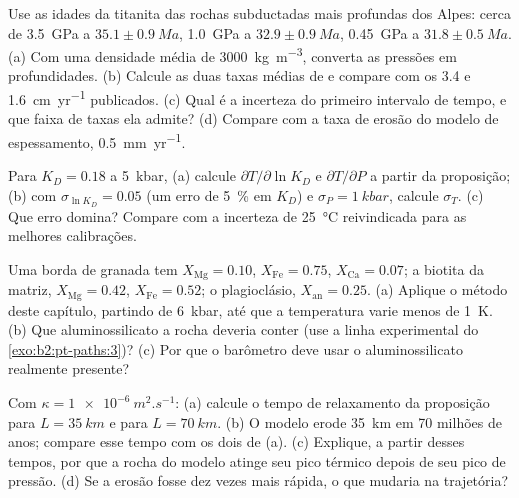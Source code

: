 \begin{exercise}[$\star\star$]\label{exo:b2:pt-paths:8}
Use as idades da titanita das rochas subductadas mais profundas dos Alpes: cerca de \qty{3.5}{GPa} a
$35.1 \pm \qty{0.9}{Ma}$, \qty{1.0}{GPa} a $32.9 \pm \qty{0.9}{Ma}$, \qty{0.45}{GPa} a
$31.8 \pm \qty{0.5}{Ma}$. (a) Com uma densidade média de \qty{3000}{kg.m^{-3}}, converta as
pressões em profundidades. (b) Calcule as duas taxas médias de  e compare com os
3.4 e \qty{1.6}{cm.yr^{-1}} publicados. (c) Qual é a incerteza do primeiro intervalo de
tempo, e que faixa de taxas ela admite? (d) Compare com a taxa de erosão do
modelo de espessamento, \qty{0.5}{mm.yr^{-1}}.
\end{exercise}

\begin{exercise}[$\star\star$]\label{exo:b2:pt-paths:9}
Para $K_D = 0.18$ a \qty{5}{kbar}, (a) calcule $\partial T/\partial\ln K_D$ e
$\partial T/\partial P$ a partir da proposição; (b) com $\sigma_{\ln K_D} = 0.05$ (um
erro de \qty{5}{\percent} em $K_D$) e $\sigma_P = \qty{1}{kbar}$, calcule $\sigma_T$.
(c) Que erro domina? Compare com a incerteza de \qty{25}{\celsius} reivindicada para
as melhores calibrações.
\end{exercise}

\begin{exercise}[$\star\star\star$]\label{exo:b2:pt-paths:10}
Uma borda de granada tem $X_{\text{Mg}} = 0.10$, $X_{\text{Fe}} = 0.75$, $X_{\text{Ca}} = 0.07$;
a biotita da matriz, $X_{\text{Mg}} = 0.42$, $X_{\text{Fe}} = 0.52$; o plagioclásio,
$X_{\text{an}} = 0.25$. (a) Aplique o método deste capítulo, partindo de \qty{6}{kbar},
até que a temperatura varie menos de \qty{1}{K}. (b) Que aluminossilicato
a rocha deveria conter (use a linha experimental do \cref{exo:b2:pt-paths:3})? (c) Por que o barômetro deve usar
o aluminossilicato realmente presente?
\end{exercise}

\begin{exercise}[$\star\star\star$]\label{exo:b2:pt-paths:11}
Com $\kappa = \qty{1e-6}{m^2.s^{-1}}$: (a) calcule o tempo de relaxamento da
proposição para $L = \qty{35}{km}$ e para $L = \qty{70}{km}$. (b) O modelo erode
\qty{35}{km} em 70 milhões de anos; compare esse tempo com os dois de (a). (c) Explique,
a partir desses tempos, por que a rocha do modelo atinge seu pico térmico depois de seu pico
de pressão. (d) Se a erosão fosse dez vezes mais rápida, o que mudaria na trajetória?
\end{exercise}

